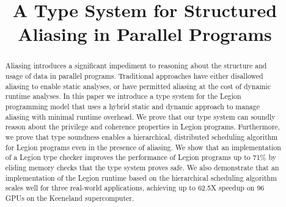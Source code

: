\documentclass[9pt,nocopyrightspace,preprint]{sigplanconf}
\begin{document}
\title{A Type System for Structured Aliasing in Parallel Programs}
\maketitle

\begin{abstract}
Aliasing introduces a significant impediment to reasoning about the
structure and usage of data in parallel programs.  Traditional approaches
have either disallowed aliasing to enable static analyses, or have permitted
aliasing at the cost of dynamic runtime analyses.  In this paper we introduce a
type system for the Legion programming model that uses a hybrid static and
dynamic approach to manage aliasing with minimal runtime overhead.  We prove 
that our type system can soundly reason about the privilege and coherence 
properties in Legion programs. Furthermore, we prove that type soundness 
enables a hierarchical, distributed scheduling algorithm for Legion programs 
even in the presence of aliasing. We show that an implementation of a Legion 
type checker improves the performance of Legion programs up to 71\% by 
eliding memory checks that the type system proves safe.  We also demonstrate 
that an implementation of the Legion runtime based on the hierarchical 
scheduling algorithm scales well for three real-world applications, achieving 
up to 62.5X speedup on 96 GPUs on the Keeneland supercomputer.



\end{abstract}
\end{document}
